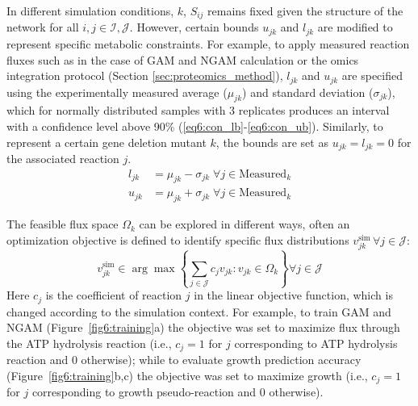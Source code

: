In different simulation conditions, $k$, $S_{ij}$ remains fixed  given the structure of the network for all $i,j\in\mathcal{I},\mathcal{J}$. However, certain bounds $u_{jk}$ and $l_{jk}$ are modified to represent specific metabolic constraints. For example, to apply measured reaction fluxes such as in the case of GAM and NGAM calculation or the omics integration protocol (Section \ref{sec:proteomics_method}), $l_{jk}$ and $u_{jk}$ are specified using the experimentally measured average ($\mu_{jk}$) and standard deviation ($\sigma_{jk}$), which for normally distributed samples with 3 replicates produces an interval with a confidence level above 90\% (\ref{eq6:con_lb}-\ref{eq6:con_ub}). %
Similarly, to represent a certain gene deletion mutant $k$, the bounds are set as $u_{jk}=l_{jk}=0$ for the associated reaction $j$.
\begin{align}
    l_{jk} &= \mu_{jk} - \sigma_{jk} \;\forall j \in  \text{Measured}_k \label{eq6:con_lb}\\
    u_{jk} &= \mu_{jk} + \sigma_{jk} \; \forall j \in  \text{Measured}_k \label{eq6:con_ub}
\end{align}

The feasible flux space $\Omega_k$ can be explored in different ways,\citep{trinh2009,palsson2015} often an optimization objective is defined to identify specific flux distributions $v_{jk}^{\text{sim}}\, \forall j \in \mathcal{J}$:
\begin{equation}
    v_{jk}^{\text{sim}} \in \arg \max \left\{ \sum_{j \in \mathcal{J}} c_j v_{jk}: v_{jk} \in \Omega_k \right\}  \forall j \in \mathcal{J} \label{eq6:fba}
\end{equation}
Here $c_j$ is the coefficient of reaction $j$ in the linear objective function, which is changed according to the simulation context. For example, to train GAM and NGAM (Figure~\ref{fig6:training}a) the objective was set to maximize flux through the ATP hydrolysis reaction (i.e., $c_j=1$ for $j$ corresponding to ATP hydrolysis reaction and 0 otherwise); while to evaluate growth prediction accuracy (Figure~\ref{fig6:training}b,c) the objective was set to maximize growth (i.e., $c_j=1$ for $j$ corresponding to growth pseudo-reaction and 0 otherwise).



